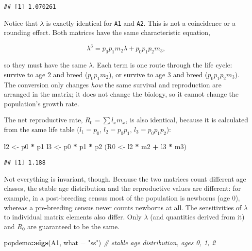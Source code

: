 \documentclass[
  a4paper]{book}
\newenvironment{Shaded}{\begin{snugshade}}{\end{snugshade}}
\newcommand{\AttributeTok}[1]{\textcolor[rgb]{0.13,0.29,0.53}{#1}}
\newcommand{\CommentTok}[1]{\textcolor[rgb]{0.56,0.35,0.01}{\textit{#1}}}
\newcommand{\FunctionTok}[1]{\textcolor[rgb]{0.13,0.29,0.53}{\textbf{#1}}}
\newcommand{\NormalTok}[1]{#1}
\newcommand{\OtherTok}[1]{\textcolor[rgb]{0.56,0.35,0.01}{#1}}
\newcommand{\SpecialCharTok}[1]{\textcolor[rgb]{0.81,0.36,0.00}{\textbf{#1}}}
\newcommand{\StringTok}[1]{\textcolor[rgb]{0.31,0.60,0.02}{#1}}
\begin{document}
\begin{verbatim}
## [1] 1.070261
\end{verbatim}

Notice that \(\lambda\) is exactly identical for \texttt{A1} and \texttt{A2}. This is not a coincidence or a rounding effect. Both matrices have the same characteristic equation,

\[
\lambda^3 = p_0 p_1 m_2 \lambda + p_0 p_1 p_2 m_3,
\]

so they must have the same \(\lambda\). Each term is one route through the life cycle: survive to age 2 and breed (\(p_0 p_1 m_2\)), or survive to age 3 and breed (\(p_0 p_1 p_2 m_3\)). The conversion only changes \emph{how} the same survival and reproduction are arranged in the matrix; it does not change the biology, so it cannot change the population's growth rate.

The net reproductive rate, \(R_0 = \sum l_x m_x\), is also identical, because it is calculated from the same life table (\(l_1 = p_0\), \(l_2 = p_0 p_1\), \(l_3 = p_0 p_1 p_2\)):

\begin{Shaded}
\begin{Highlighting}[]
\NormalTok{l2 }\OtherTok{\textless{}{-}}\NormalTok{ p0 }\SpecialCharTok{*}\NormalTok{ p1}
\NormalTok{l3 }\OtherTok{\textless{}{-}}\NormalTok{ p0 }\SpecialCharTok{*}\NormalTok{ p1 }\SpecialCharTok{*}\NormalTok{ p2}
\NormalTok{(R0 }\OtherTok{\textless{}{-}}\NormalTok{ l2 }\SpecialCharTok{*}\NormalTok{ m2 }\SpecialCharTok{+}\NormalTok{ l3 }\SpecialCharTok{*}\NormalTok{ m3)}
\end{Highlighting}
\end{Shaded}

\begin{verbatim}
## [1] 1.188
\end{verbatim}

Not everything is invariant, though. Because the two matrices count different age classes, the stable age distribution and the reproductive values are different: for example, in a post-breeding census most of the population is newborns (age 0), whereas a pre-breeding census never counts newborns at all. The sensitivities of \(\lambda\) to individual matrix elements also differ. Only \(\lambda\) (and quantities derived from it) and \(R_0\) are guaranteed to be the same.

\begin{Shaded}
\begin{Highlighting}[]
\NormalTok{popdemo}\SpecialCharTok{::}\FunctionTok{eigs}\NormalTok{(A1, }\AttributeTok{what =} \StringTok{"ss"}\NormalTok{) }\CommentTok{\# stable age distribution, ages 0, 1, 2}
\end{Highlighting}
\end{Shaded}
\end{document}
